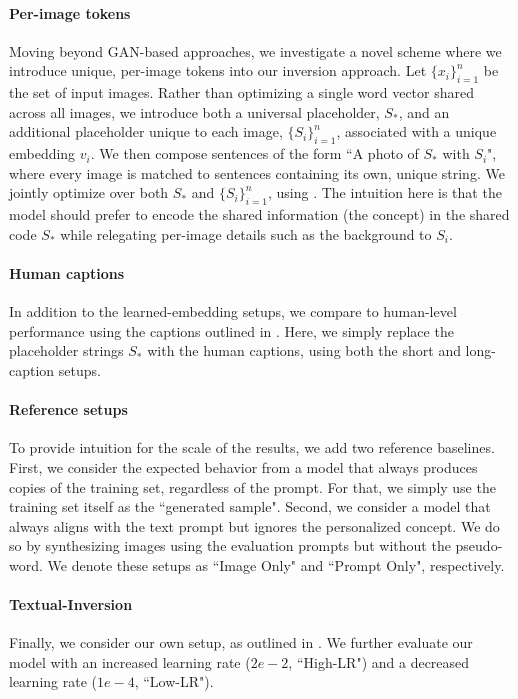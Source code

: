 \paragraph{Per-image tokens}
Moving beyond GAN-based approaches, we investigate a novel scheme where we introduce unique, per-image tokens into our inversion approach. Let $\{x_i\}_{i=1}^n$ be the set of input images. Rather than optimizing a single word vector shared across all images, we introduce both a universal placeholder, $S_*$, and an additional placeholder unique to each image, $\{S_i\}_{i=1}^n$, associated with a unique embedding $v_i$. We then compose sentences of the form ``A photo of $S_*$ with $S_i$", where every image is matched to sentences containing its own, unique string. We jointly optimize over both $S_*$ and $\{S_i\}_{i=1}^n$, using . The intuition here is that the model should prefer to encode the shared information (\ie the concept) in the shared code $S_*$ while relegating per-image details such as the background to $S_i$. 

\paragraph{Human captions}
In addition to the learned-embedding setups, we compare to human-level performance using the captions outlined in . Here, we simply replace the placeholder strings $S_*$ with the human captions, using both the short and long-caption setups. 

\paragraph{Reference setups}
To provide intuition for the scale of the results, we add two reference baselines.
First, we consider the expected behavior from a model that always produces copies of the training set, regardless of the prompt. For that, we simply use the training set itself as the ``generated sample".
Second, we consider a model that always aligns with the text prompt but ignores the personalized concept. We do so by synthesizing images using the evaluation prompts but without the pseudo-word.
We denote these setups as ``Image Only" and ``Prompt Only", respectively.

\paragraph{Textual-Inversion}
Finally, we consider our own setup, as outlined in . We further evaluate our model with an increased learning rate ($2e-2$, ``High-LR") and a decreased learning rate ($1e-4$, ``Low-LR").

